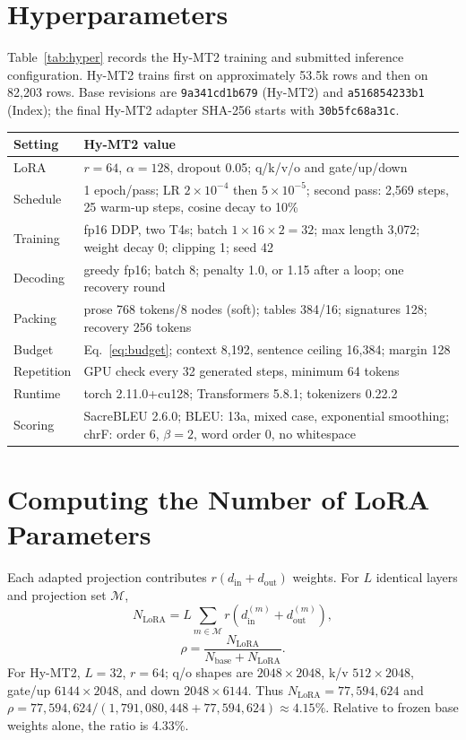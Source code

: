 \documentclass[11pt]{article}
\begin{document}
\section{Hyperparameters}\label{app:hyper}
Table~\ref{tab:hyper} records the Hy-MT2 training and submitted inference configuration. Hy-MT2 trains first on approximately 53.5k rows and then on 82,203 rows. Base revisions are \texttt{9a341cd1b679} (Hy-MT2) and \texttt{a516854233b1} (Index); the final Hy-MT2 adapter SHA-256 starts with \texttt{30b5fc68a31c}.
\noindent\begin{minipage}{\columnwidth}
\centering\small
\begin{tabularx}{\columnwidth}{@{}lX@{}}
\toprule
Setting & Hy-MT2 value \\
\midrule
LoRA & $r=64$, $\alpha=128$, dropout 0.05; q/k/v/o and gate/up/down \\
Schedule & 1 epoch/pass; LR $2\!\times\!10^{-4}$ then $5\!\times\!10^{-5}$; second pass: 2,569 steps, 25 warm-up steps, cosine decay to 10\% \\
Training & fp16 DDP, two T4s; batch $1\!\times\!16\!\times\!2=32$; max length 3,072; weight decay 0; clipping 1; seed 42 \\
Decoding & greedy fp16; batch 8; penalty 1.0, or 1.15 after a loop; one recovery round \\
Packing & prose 768 tokens/8 nodes (soft); tables 384/16; signatures 128; recovery 256 tokens \\
Budget & Eq.~\eqref{eq:budget}; context 8,192, sentence ceiling 16,384; margin 128 \\
Repetition & GPU check every 32 generated steps, minimum 64 tokens \\
Runtime & torch 2.11.0+cu128; Transformers 5.8.1; tokenizers 0.22.2 \\
Scoring & SacreBLEU 2.6.0; BLEU: 13a, mixed case, exponential smoothing; chrF: order 6, $\beta=2$, word order 0, no whitespace \\
\bottomrule
\end{tabularx}
\label{tab:hyper}
\end{minipage}

\section{Computing the Number of LoRA Parameters}\label{app:lora}
Each adapted projection contributes $r(d_{\mathrm{in}}+d_{\mathrm{out}})$ weights. For $L$ identical layers and projection set $\mathcal{M}$,
\begin{equation}
N_{\mathrm{LoRA}}=L\sum_{m\in\mathcal{M}}r(d_{\mathrm{in}}^{(m)}+d_{\mathrm{out}}^{(m)}),
\end{equation}
\begin{equation}
\rho=\frac{N_{\mathrm{LoRA}}}{N_{\mathrm{base}}+N_{\mathrm{LoRA}}}.
\end{equation}
For Hy-MT2, $L=32$, $r=64$; q/o shapes are $2048\!\times\!2048$, k/v $512\!\times\!2048$, gate/up $6144\!\times\!2048$, and down $2048\!\times\!6144$. Thus $N_{\mathrm{LoRA}}=77{,}594{,}624$ and $\rho=77{,}594{,}624/(1{,}791{,}080{,}448+77{,}594{,}624)\approx4.15\%$. Relative to frozen base weights alone, the ratio is 4.33\%.
\end{document}
